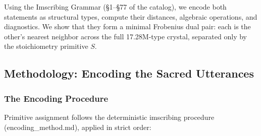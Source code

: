 \documentclass[12pt,a4paper]{article}
\newcommand{\pilcrow}{\S}
\begin{document}
Using the Imscribing Grammar (\pilcrow{}1--\pilcrow{}77 of the catalog), we encode both statements as structural types, compute their distances, algebraic operations, and diagnostics. We show that they form a minimal Frobenius dual pair: each is the other's nearest neighbor across the full 17.28M-type crystal, separated only by the stoichiometry primitive $S$.

\subsection{Methodology: Encoding the Sacred Utterances}

\subsubsection{The Encoding Procedure}

Primitive assignment follows the deterministic imscribing procedure (encoding\_method.md), applied in strict order:
\end{document}
